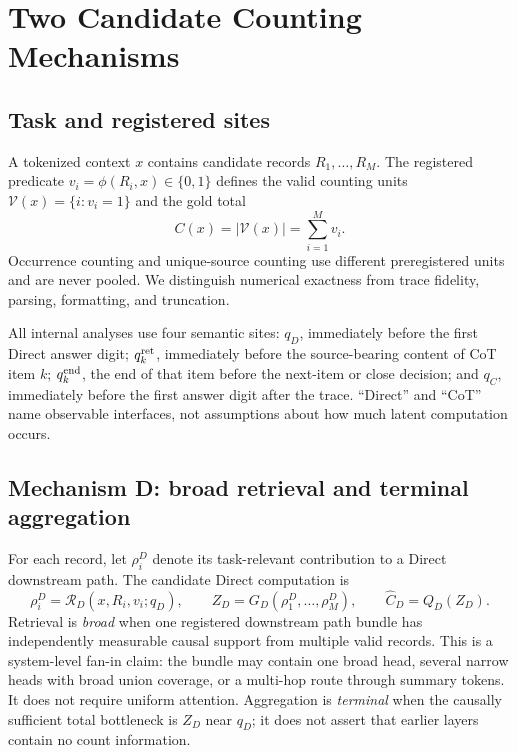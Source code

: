 \documentclass[11pt]{article}
\begin{document}
\section{Two Candidate Counting Mechanisms}
\label{sec:definitions}

\subsection{Task and registered sites}

A tokenized context $x$ contains candidate records $R_1,\ldots,R_M$. The registered predicate $v_i=\phi(R_i,x)\in\{0,1\}$ defines the valid counting units $\mathcal V(x)=\{i:v_i=1\}$ and the gold total
\begin{equation}
C(x)=|\mathcal V(x)|=\sum_{i=1}^{M}v_i.
\label{eq:count-task}
\end{equation}
Occurrence counting and unique-source counting use different preregistered units and are never pooled. We distinguish numerical exactness from trace fidelity, parsing, formatting, and truncation.

All internal analyses use four semantic sites: $q_D$, immediately before the first Direct answer digit; $q_k^{\rm ret}$, immediately before the source-bearing content of CoT item $k$; $q_k^{\rm end}$, the end of that item before the next-item or close decision; and $q_C$, immediately before the first answer digit after the trace. ``Direct'' and ``CoT'' name observable interfaces, not assumptions about how much latent computation occurs.

\subsection{Mechanism D: broad retrieval and terminal aggregation}

For each record, let $\rho_i^D$ denote its task-relevant contribution to a Direct downstream path. The candidate Direct computation is
\begin{equation}
\rho_i^D=\mathcal R_D(x,R_i,v_i;q_D),\qquad
Z_D=G_D(\rho_1^D,\ldots,\rho_M^D),\qquad
\widehat C_D=Q_D(Z_D).
\label{eq:direct-chain}
\end{equation}
Retrieval is \emph{broad} when one registered downstream path bundle has independently measurable causal support from multiple valid records. This is a system-level fan-in claim: the bundle may contain one broad head, several narrow heads with broad union coverage, or a multi-hop route through summary tokens. It does not require uniform attention. Aggregation is \emph{terminal} when the causally sufficient total bottleneck is $Z_D$ near $q_D$; it does not assert that earlier layers contain no count information.
\end{document}
